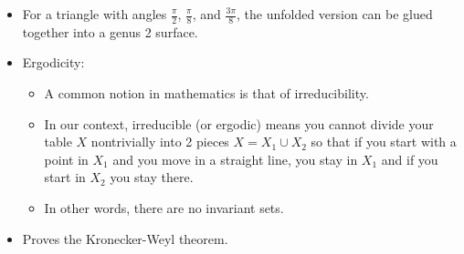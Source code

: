 \documentclass[../main.tex]{subfiles}
\begin{document}
\begin{itemize}
    \item For a triangle with angles $\frac{\pi}{2}$, $\frac{\pi}{8}$, and $\frac{3\pi}{8}$, the unfolded version can be glued together into a genus 2 surface.
    \item Ergodicity:
    \begin{itemize}
        \item A common notion in mathematics is that of irreducibility.
        \item In our context, irreducible (or ergodic) means you cannot divide your table $X$ nontrivially into 2 pieces $X=X_1\cup X_2$ so that if you start with a point in $X_1$ and you move in a straight line, you stay in $X_1$ and if you start in $X_2$ you stay there.
        \item In other words, there are no invariant sets.
    \end{itemize}
    \item Proves the Kronecker-Weyl theorem.
\end{itemize}
\end{document}
